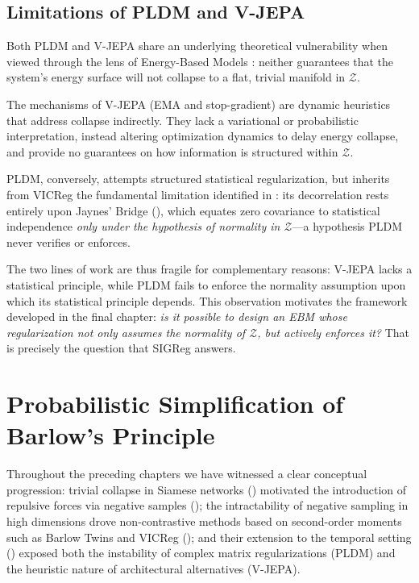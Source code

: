 \documentclass[11pt, oneside, openany]{book}
\begin{document}
\section{Limitations of PLDM and V-JEPA}
\label{sec:6.5}

Both PLDM and V-JEPA share an underlying theoretical vulnerability when viewed through the lens of Energy-Based Models \cite{lecun2006tutorial}: neither guarantees that the system's energy surface will not collapse to a flat, trivial manifold in $\mathcal{Z}$.

The mechanisms of V-JEPA (EMA and stop-gradient) are dynamic heuristics that address collapse indirectly. They lack a variational or probabilistic interpretation, instead altering optimization dynamics to delay energy collapse, and provide no guarantees on how information is structured within $\mathcal{Z}$.

PLDM, conversely, attempts structured statistical regularization, but inherits from VICReg the fundamental limitation identified in : its decorrelation rests entirely upon Jaynes' Bridge (), which equates zero covariance to statistical independence \textit{only under the hypothesis of normality in $\mathcal{Z}$}---a hypothesis PLDM never verifies or enforces.

The two lines of work are thus fragile for complementary reasons: V-JEPA lacks a statistical principle, while PLDM fails to enforce the normality assumption upon which its statistical principle depends. This observation motivates the framework developed in the final chapter: \textit{is it possible to design an EBM whose regularization not only assumes the normality of $\mathcal{Z}$, but actively enforces it?} That is precisely the question that SIGReg answers.


\chapter{Probabilistic Simplification of Barlow's Principle}
\label{chap:7}

Throughout the preceding chapters we have witnessed a clear conceptual progression: trivial collapse in Siamese networks () motivated the introduction of repulsive forces via negative samples (); the intractability of negative sampling in high dimensions drove non-contrastive methods based on second-order moments such as Barlow Twins and VICReg (); and their extension to the temporal setting () exposed both the instability of complex matrix regularizations (PLDM) and the heuristic nature of architectural alternatives (V-JEPA).
\end{document}
